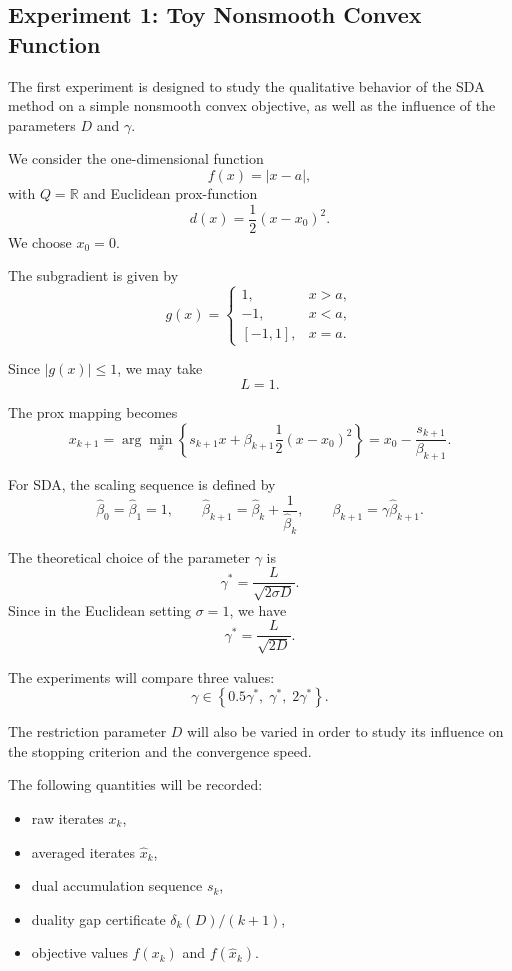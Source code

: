 \documentclass[12pt,a4paper]{article}
\begin{document}
\subsection{Experiment 1: Toy Nonsmooth Convex Function}

The first experiment is designed to study the qualitative behavior of the SDA method on a simple nonsmooth convex objective, as well as the influence of the parameters $D$ and $\gamma$.

We consider the one-dimensional function
\[
f(x)=|x-a|,
\]
with $Q=\mathbb{R}$ and Euclidean prox-function
\[
d(x)=\frac12(x-x_0)^2.
\]
We choose $x_0=0$.

The subgradient is given by
\[
g(x)=
\begin{cases}
1, & x>a,\\
-1, & x<a,\\
[-1,1], & x=a.
\end{cases}
\]

Since $|g(x)|\le 1$, we may take
\[
L=1.
\]

The prox mapping becomes
\[
x_{k+1}=\arg\min_x \left\{ s_{k+1}x+\beta_{k+1}\frac12(x-x_0)^2 \right\}
= x_0-\frac{s_{k+1}}{\beta_{k+1}}.
\]

For SDA, the scaling sequence is defined by
\[
\hat\beta_0=\hat\beta_1=1,
\qquad
\hat\beta_{k+1}=\hat\beta_k+\frac1{\hat\beta_k},
\qquad
\beta_{k+1}=\gamma \hat\beta_{k+1}.
\]

The theoretical choice of the parameter $\gamma$ is
\[
\gamma^*=\frac{L}{\sqrt{2\sigma D}}.
\]
Since in the Euclidean setting $\sigma=1$, we have
\[
\gamma^*=\frac{L}{\sqrt{2D}}.
\]

The experiments will compare three values:
\[
\gamma\in\left\{0.5\gamma^*,\;\gamma^*,\;2\gamma^*\right\}.
\]

The restriction parameter $D$ will also be varied in order to study its influence on the stopping criterion and the convergence speed.

The following quantities will be recorded:
\begin{itemize}
\item raw iterates $x_k$,
\item averaged iterates $\hat x_k$,
\item dual accumulation sequence $s_k$,
\item duality gap certificate $\delta_k(D)/(k+1)$,
\item objective values $f(x_k)$ and $f(\hat x_k)$.
\end{itemize}
\end{document}
